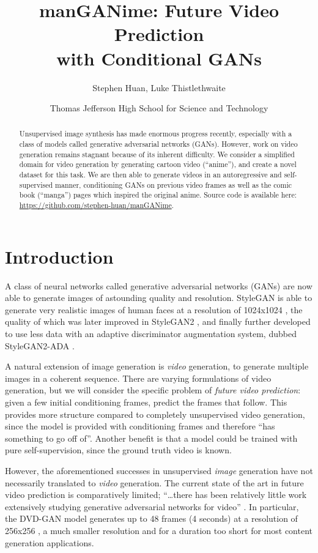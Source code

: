 \documentclass[11pt, oneside]{article}
\title{manGANime: Future Video Prediction \\ with Conditional GANs}
\author{Stephen Huan, Luke Thistlethwaite}
\date{Thomas Jefferson High School for Science and Technology}
\begin{document}
\maketitle

\begin{abstract}
  Unsupervised image synthesis has made enormous progress recently, especially
  with a class of models called generative adversarial networks (GANs).
  However, work on video generation remains stagnant because of its inherent
  difficulty. We consider a simplified domain for video generation by
  generating cartoon video (\enquote{anime}), and create a novel dataset for
  this task. We are then able to generate videos in an autoregressive and
  self-supervised manner, conditioning GANs on previous video frames as well
  as the comic book (\enquote{manga}) pages which inspired the original anime.
  Source code is available here:
  \href{https://github.com/stephen-huan/manGANime}
       {https://github.com/stephen-huan/manGANime}.
\end{abstract}

\section{Introduction} \label{sec:intro} 
A class of neural networks called generative adversarial networks (GANs)
are now able to generate images of astounding quality and resolution.
StyleGAN is able to generate very realistic images of human faces at a
resolution of 1024x1024 \cite{stylegan}, the quality of which was later
improved in StyleGAN2 \cite{stylegan2}, and finally further developed to
use less data with an adaptive discriminator augmentation system, dubbed
StyleGAN2-ADA \cite{stylegan2ada}.

A natural extension of image generation is \emph{video} generation, to generate
multiple images in a coherent sequence. There are varying formulations of video
generation, but we will consider the specific problem of \emph{future video
prediction}: given a few initial conditioning frames, predict the frames that
follow. This provides more structure compared to completely unsupervised video
generation, since the model is provided with conditioning frames and therefore
\enquote{has something to go off of}. Another benefit is that a model could be
trained with pure self-supervision, since the ground truth video is known.

However, the aforementioned successes in unsupervised \emph{image}
generation have not necessarily translated to \emph{video} generation.
The current state of the art in future video prediction is comparatively
limited; \enquote{\ldots there has been relatively little work extensively
studying generative adversarial networks for video} \cite{scene}. In
particular, the DVD-GAN model generates up to 48 frames (4 seconds) at a
resolution of 256x256 \cite{dvdgan}, a much smaller resolution and for
a duration too short for most content generation applications.
\end{document}
